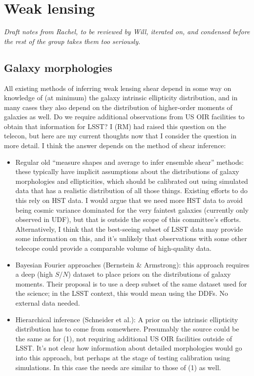\section{Weak lensing}

{\em Draft notes from Rachel, to be reviewed by Will, iterated on, and condensed before the rest of the group
  takes them too seriously.}

\subsection{Galaxy morphologies}

All existing methods of inferring weak lensing shear depend in some way on knowledge of (at minimum)
the galaxy intrinsic ellipticity distribution, and in many cases they also depend on the
distribution of higher-order moments of galaxies as well.  Do we require additional observations
from US OIR facilities to obtain that information for LSST?  I (RM) had raised this question on the
telecon, but here are my current thoughts now that I consider the question in more detail.  I think
the answer depends on the method of shear inference:

\begin{itemize}
\item Regular old ``measure shapes and average to infer ensemble shear'' methods: these typically
  have implicit assumptions about the distributions of galaxy morphologies and ellipticities, which
  should be calibrated out using simulated data that has a realistic distribution of all those
  things.  Existing efforts to do this rely on HST data.  I would argue that we need more HST data
  to avoid being cosmic variance dominated for the very faintest galaxies (currently only observed
  in UDF), but that is outside the scope of this committee's efforts.  Alternatively, I think that
  the best-seeing subset of LSST data may provide some information on this, and it's unlikely that
  observations with some other telecope could provide a comparable volume of high-quality data.
\item Bayesian Fourier approaches (Bernstein \& Armstrong): this approach requires a deep (high
  $S/N$) dataset to place priors on the distributions of galaxy moments.  Their proposal is to use a
  deep subset of the same dataset used for the science; in the LSST context, this would mean using
  the DDFs.  No external data needed.
\item Hierarchical inference (Schneider et al.): A prior on the intrinsic ellipticity distribution
  has to come from somewhere.  Presumably the source could be the same as for (1), not requiring
  additional US OIR facilities outside of LSST.  It's not clear how information about detailed
  morphologies would go into this approach, but perhaps at the stage of testing calibration using
  simulations.  In this case the needs are similar to those of (1) as well.
\end{itemize}

